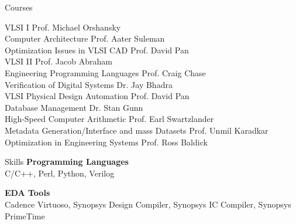 \documentclass{resume} %
\begin{document}
\begin{rSection}{Courses}

VLSI I                                           \hfill Prof. Michael Orshansky \\
Computer Architecture                            \hfill Prof. Aater Suleman \\
Optimization Issues in VLSI CAD                  \hfill Prof. David Pan \\
VLSI II                                          \hfill Prof. Jacob Abraham \\
Engineering Programming Languages                \hfill Prof. Craig Chase \\
Verification of Digital Systems                  \hfill Dr. Jay Bhadra \\
VLSI Physical Design Automation                  \hfill Prof. David Pan \\
Database Management                              \hfill Dr. Stan Gunn \\
High-Speed Computer Arithmetic                   \hfill Prof. Earl Swartzlander \\
Metadata Generation/Interface and mass Datasets  \hfill Prof. Unmil Karadkar \\
Optimization in Engineering Systems              \hfill Prof. Ross Baldick \\ 

\end{rSection}


\begin{rSection}{Skills}
{\bf Programming Languages} \\
C/C++, Perl, Python, Verilog

{\bf EDA Tools} \\
Cadence Virtuoso, Synopsys Design Compiler, Synopsys IC Compiler, Synopsys PrimeTime

\end{rSection}

\end{document}
